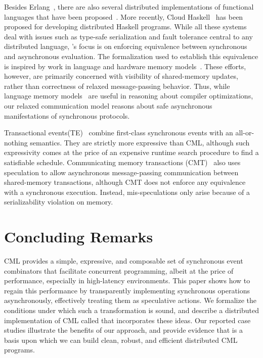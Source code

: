 Besides Erlang~\cite{erlang}, there are also several distributed
implementations of functional languages that have been
proposed~\cite{DCaml,Acute}.  More recently, Cloud Haskell~\cite{CloudHaskell}
has been proposed for developing distributed Haskell programs. While all these
systems deal with issues such as type-safe serialization and fault tolerance
central to any distributed language, \rxcml's focus is on enforcing equivalence
between synchronous and asynchronous evaluation. The formalization used to
establish this equivalence is inspired by work in language and hardware memory
models~\cite{Sewell2010,Demange2013,Boehm08}.  These efforts, however, are
primarily concerned with visibility of shared-memory updates, rather than
correctness of relaxed message-passing behavior. Thus, while language memory
models~\cite{Boehm08,Demange2013} are useful in reasoning about compiler
optimizations, our relaxed communication model reasons about safe asynchronous
manifestations of synchronous protocols.

Transactional events(TE)~\cite{Donnelly06,Effinger-Dean08} combine first-class
synchronous events with an all-or-nothing semantics.  They are strictly more
expressive than CML, although such expressivity comes at the price of an
expensive runtime search procedure to find a satisfiable schedule.
Communicating memory transactions (CMT)~\cite{Lesani11} also uses speculation
to allow asynchronous message-passing communication between shared-memory
transactions, although CMT does not enforce any equivalence with a synchronous
execution. Instead, mis-speculations only arise because of a serializability
violation on memory.

\section{Concluding Remarks}

CML provides a simple, expressive, and composable set of synchronous event
combinators that facilitate concurrent programming, albeit at the price of
performance, especially in high-latency environments. This paper shows how to
regain this performance by transparently implementing synchronous operations
asynchronously, effectively treating them as speculative actions.  We formalize
the conditions under which such a transformation is sound, and describe a
distributed implementation of CML called \rxcml that incorporates these ideas.
Our reported case studies illustrate the benefits of our approach, and provide
evidence that \rxcml is a basis upon which we can build clean, robust, and
efficient distributed CML programs.
